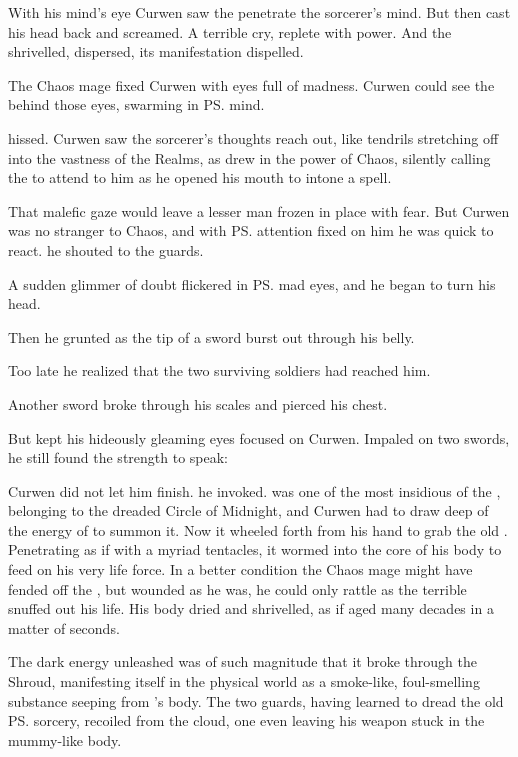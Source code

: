 With his mind's eye Curwen saw the \Qliphah{} penetrate the sorcerer's mind. 
But then \Onatol{} cast his head back and screamed. 
A terrible cry, replete with \chaotic{} power. 
And the \Qliphah{} shrivelled, dispersed, its manifestation dispelled. 

The Chaos mage fixed Curwen with eyes full of madness. 
Curwen could see the \daemons{} behind those eyes, swarming in \ps{\Onatol}{} mind. 

 \Onatol hissed. 
Curwen saw the sorcerer's thoughts reach out, like tendrils stretching off into the vastness of the Realms, as \Onatol{} drew in the power of Chaos, silently calling the \daemons{} to attend to him as he opened his mouth to intone a spell. 

That malefic gaze would leave a lesser man frozen in place with fear. 
But Curwen was no stranger to Chaos, and with \ps{\Onatol}{} attention fixed on him he was quick to react. 
 he shouted to the guards. 

A sudden glimmer of doubt flickered in \ps{\Onatol}{} mad eyes, and he began to turn his head. 

Then he grunted as the tip of a sword burst out through his belly. 

Too late he realized that the two surviving soldiers had reached him. 

Another sword broke through his scales and pierced his chest. 

But \Onatol kept his hideously gleaming eyes focused on Curwen. 
Impaled on two swords, he still found the strength to speak:

Curwen did not let him finish. 
\ta{\Bozchul!} he invoked. 
\Bozchul was one of the most insidious of the \qliphoth, belonging to the dreaded Circle of Midnight, and Curwen had to draw deep of the energy of \nieur{} to summon it. 
Now it wheeled forth from his hand to grab the old \scatha. 
Penetrating \Onatol{} as if with a myriad tentacles, it wormed into the core of his body to feed on his very life force. 
In a better condition the Chaos mage might have fended off the \Qliphah, but wounded as he was, he could only rattle as the terrible \Archon{} snuffed out his life. 
His body dried and shrivelled, as if aged many decades in a matter of seconds. 

The dark energy unleashed was of such magnitude that it broke through the Shroud, manifesting itself in the physical world as a smoke-like, foul-smelling substance seeping from \Onatol's body. 
The two guards, having learned to dread the old \ps{\dax} sorcery, recoiled from the cloud, one even leaving his weapon stuck in the mummy-like body. 

